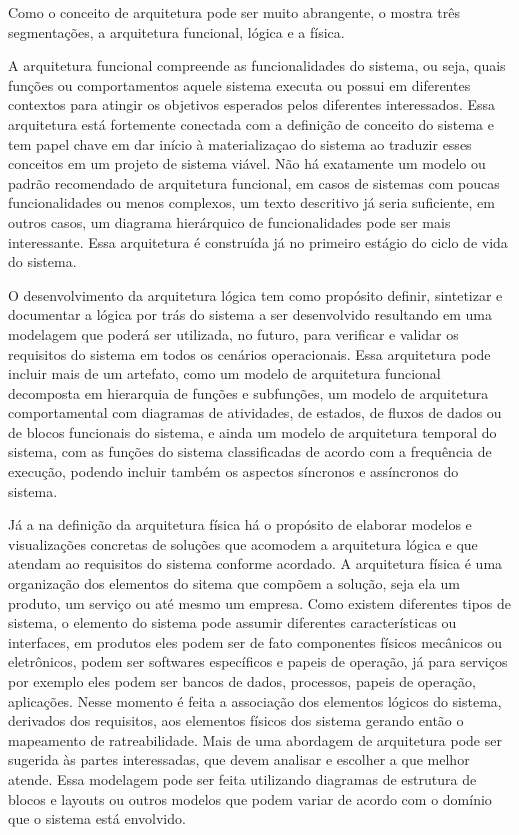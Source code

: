 	Como o conceito de arquitetura pode ser muito abrangente, o \cite{sebok2024} mostra três segmentações, a arquitetura funcional, lógica e a física.

	A arquitetura funcional compreende as funcionalidades do sistema, ou seja, quais funções ou comportamentos 
	aquele sistema executa ou possui em diferentes contextos para atingir os objetivos esperados pelos diferentes interessados.
	Essa arquitetura está fortemente conectada com a definição de conceito do sistema e tem papel chave em dar início à materializaçao do sistema
	ao traduzir esses conceitos em um projeto de sistema viável. Não há exatamente um modelo ou padrão recomendado de
	arquitetura funcional, em casos de sistemas com poucas funcionalidades ou menos complexos, um texto descritivo já seria 
	suficiente, em outros casos, um diagrama hierárquico de funcionalidades pode ser mais interessante. Essa arquitetura é 
	construída já no primeiro estágio do ciclo de vida do sistema.

	O desenvolvimento da arquitetura lógica tem como propósito definir, sintetizar e documentar a lógica por trás do sistema a ser desenvolvido
	resultando em uma modelagem que poderá ser utilizada, no futuro, para verificar e validar os requisitos do sistema em todos os cenários operacionais.
	Essa arquitetura pode incluir mais de um artefato, como um modelo de arquitetura funcional decomposta em hierarquia de funções e subfunções, um modelo de arquitetura comportamental com diagramas
	de atividades, de estados, de fluxos de dados ou de blocos funcionais do sistema, e ainda um modelo de arquitetura temporal do sistema, com as funções do sistema 
	classificadas de acordo com a frequência de execução, podendo incluir também os aspectos síncronos e assíncronos do sistema.

	Já a na definição da arquitetura física há o propósito de elaborar modelos e visualizações concretas de soluções que acomodem a arquitetura
	lógica e que atendam ao requisitos do sistema conforme acordado. A arquitetura física é uma organização dos elementos do sitema
	que compõem a solução, seja ela um produto, um serviço ou até mesmo um empresa. Como existem diferentes tipos de sistema, o elemento do sistema pode
	assumir diferentes características ou interfaces, em produtos eles podem ser de fato componentes físicos mecânicos ou eletrônicos, podem ser softwares
	específicos e papeis de operação, já para serviços por exemplo eles podem ser bancos de dados, processos, papeis de operação, aplicações.
	Nesse momento é feita a associação dos elementos lógicos do sistema, derivados dos requisitos, aos elementos físicos dos sistema gerando então o mapeamento de ratreabilidade.
	Mais de uma abordagem de arquitetura pode ser sugerida às partes interessadas, que devem analisar e escolher a que melhor atende. Essa modelagem pode ser feita utilizando
	diagramas de estrutura de blocos e layouts ou outros modelos que podem variar de acordo com o domínio que o sistema está envolvido.

